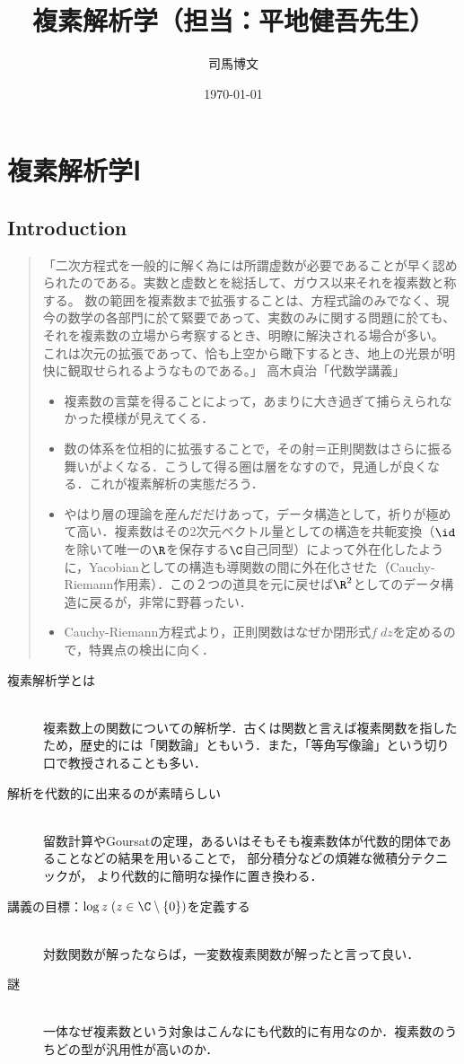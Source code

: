 \documentclass[uplatex, dvipdfmx]{jsreport}
\title{複素解析学（担当：平地健吾先生）}
\author{司馬博文}
\date{\today}
\begin{document}
\tableofcontents

\part{複素解析学Ⅰ}

\chapter{Introduction}

\begin{quotation}
    「二次方程式を一般的に解く為には所謂虚数が必要であることが早く認められたのである。実数と虚数とを総括して、ガウス以来それを複素数と称する。
    数の範囲を複素数まで拡張することは、方程式論のみでなく、現今の数学の各部門に於て緊要であって、実数のみに関する問題に於ても、それを複素数の立場から考察するとき、明瞭に解決される場合が多い。
    これは次元の拡張であって、恰も上空から瞰下するとき、地上の光景が明快に観取せられるようなものである。」
        高木貞治「代数学講義」
    \begin{itemize}
        \item 複素数の言葉を得ることによって，あまりに大き過ぎて捕らえられなかった模様が見えてくる．
        \item 数の体系を位相的に拡張することで，その射＝正則関数はさらに振る舞いがよくなる．こうして得る圏は層をなすので，見通しが良くなる．これが複素解析の実態だろう．
        \item やはり層の理論を産んだだけあって，データ構造として，祈りが極めて高い．複素数はその$2$次元ベクトル量としての構造を共軛変換（$\id$を除いて唯一の$\R$を保存する$\C$自己同型）によって外在化したように，Yacobianとしての構造も導関数の間に外在化させた（Cauchy-Riemann作用素）．この２つの道具を元に戻せば$\R^2$としてのデータ構造に戻るが，非常に野暮ったい．
        \item Cauchy-Riemann方程式より，正則関数はなぜか閉形式$f\;dz$を定めるので，特異点の検出に向く．
    \end{itemize}
\end{quotation}

\begin{description}
    \item[複素解析学とは]\mbox{}\\
        複素数上の関数についての解析学．古くは関数と言えば複素関数を指したため，歴史的には「関数論」ともいう．また，「等角写像論」という切り口で教授されることも多い．
    \item[解析を代数的に出来るのが素晴らしい]\mbox{}\\
        留数計算やGoursatの定理，あるいはそもそも複素数体が代数的閉体であることなどの結果を用いることで，
        部分積分などの煩雑な微積分テクニックが，
        より代数的に簡明な操作に置き換わる．
    \item[講義の目標：$\log z\;(z\in\C\setminus\{0\})$を定義する]\mbox{}\\
        対数関数が解ったならば，一変数複素関数が解ったと言って良い．
    \item[謎]\mbox{}\\
        一体なぜ複素数という対象はこんなにも代数的に有用なのか．複素数のうちどの型が汎用性が高いのか．
\end{description}
\end{document}
